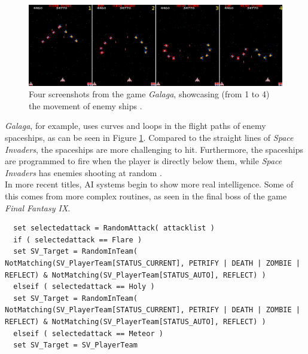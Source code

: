 \begin{figure}[H]
  \centering
  \includegraphics[width=15cm]{figures/ExampleGalaga.png}
  \caption{Four screenshots from the game \textit{Galaga}, showcasing (from 1 to 4) the movement of enemy ships \cite{galaga81}.}
  \label{fig:Galaga}
\end{figure}
\textit{Galaga}, for example, uses curves and loops in the flight paths of enemy spaceships, as can be seen in Figure \ref{fig:Galaga}. Compared to the straight lines of \textit{Space Invaders}, the spaceships are more challenging to hit. Furthermore, the spaceships are programmed to fire when the player is directly below them, while \textit {Space Invaders} has enemies shooting at random \cite{schw04}.\\

In more recent titles, AI systems begin to show more real intelligence. Some of this comes from more complex routines, as seen in the final boss of the game \textit{Final Fantasy IX}.

\begin{lstlisting}
  set selectedattack = RandomAttack( attacklist )
  if ( selectedattack == Flare )
  set SV_Target = RandomInTeam( NotMatching(SV_PlayerTeam[STATUS_CURRENT], PETRIFY | DEATH | ZOMBIE | REFLECT) & NotMatching(SV_PlayerTeam[STATUS_AUTO], REFLECT) )
  elseif ( selectedattack == Holy )
  set SV_Target = RandomInTeam( NotMatching(SV_PlayerTeam[STATUS_CURRENT], PETRIFY | DEATH | ZOMBIE | REFLECT) & NotMatching(SV_PlayerTeam[STATUS_AUTO], REFLECT) )
  elseif ( selectedattack == Meteor )
  set SV_Target = SV_PlayerTeam
\end{lstlisting}

